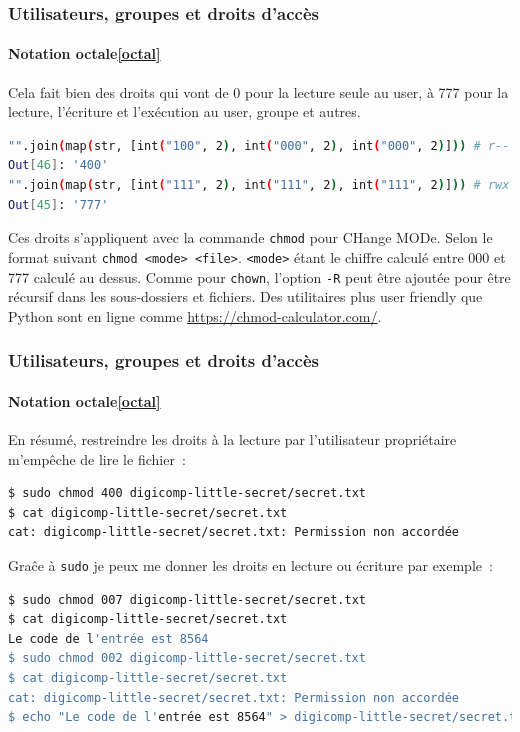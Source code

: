 \documentclass{beamer}
\begin{document}
    \begin{frame}[fragile]
        \transdissolve
        \frametitle{Utilisateurs, groupes et droits d'accès}
        \framesubtitle{Notation octale\cref{octal}}
        Cela fait bien des droits qui vont de 0 pour la lecture seule au user, à 777 pour la lecture, l'écriture et l'exécution au user, groupe et autres.
        \begin{lstlisting}[language=bash]
"".join(map(str, [int("100", 2), int("000", 2), int("000", 2)])) # r-- pour user
Out[46]: '400'
"".join(map(str, [int("111", 2), int("111", 2), int("111", 2)])) # rwx pour tous
Out[45]: '777'
        \end{lstlisting}
        Ces droits s'appliquent avec la commande \lstinline{chmod} pour CHange MODe.
        Selon le format suivant \lstinline{chmod <mode> <file>}.
        \lstinline{<mode>} étant le chiffre calculé entre 000 et 777 calculé au dessus.
        Comme pour \lstinline{chown}, l'option \lstinline{-R} peut être ajoutée pour être récursif dans les sous-dossiers et fichiers.
        \bigbreak
        Des utilitaires plus user friendly que Python sont en ligne comme \url{https://chmod-calculator.com/}.
    \end{frame}

    \begin{frame}[fragile]
        \transdissolve
        \frametitle{Utilisateurs, groupes et droits d'accès}
        \framesubtitle{Notation octale\cref{octal}}
        En résumé, restreindre les droits à la lecture par l'utilisateur propriétaire m'empêche de lire le fichier~:
        \begin{lstlisting}[language=bash]
$ sudo chmod 400 digicomp-little-secret/secret.txt
$ cat digicomp-little-secret/secret.txt
cat: digicomp-little-secret/secret.txt: Permission non accordée
        \end{lstlisting}
        Graĉe à \lstinline{sudo} je peux me donner les droits en lecture ou écriture par exemple~:
        \begin{lstlisting}[language=bash]
$ sudo chmod 007 digicomp-little-secret/secret.txt
$ cat digicomp-little-secret/secret.txt
Le code de l'entrée est 8564
$ sudo chmod 002 digicomp-little-secret/secret.txt
$ cat digicomp-little-secret/secret.txt
cat: digicomp-little-secret/secret.txt: Permission non accordée
$ echo "Le code de l'entrée est 8564" > digicomp-little-secret/secret.txt
        \end{lstlisting}
    \end{frame}
\end{document}
